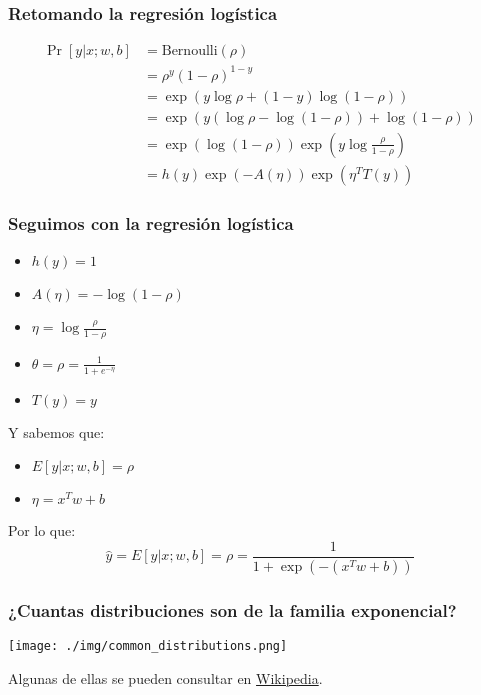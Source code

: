 \documentclass{beamer}
\begin{document}
\begin{frame}
  \frametitle{Retomando la regresión logística}

  \begin{align*}
    \Pr[y | x; w, b] &= \text{Bernoulli}(\rho) \\
    &= \rho^{y} (1 - \rho)^{1 - y} \\
    &= \exp(y \log \rho + (1 - y) \log (1 - \rho)) \\
    &= \exp(y (\log \rho - \log (1 - \rho)) + \log (1 - \rho)) \\
    &= \exp(\log (1 - \rho)) \exp(y \log \frac{\rho}{1 - \rho}) \\
    &= h(y) \exp(-A(\eta)) \exp(\eta^T T(y))
  \end{align*}

\end{frame}

\begin{frame}
  \frametitle{Seguimos con la regresión logística}

  \begin{itemize}
    \item $h(y) = 1$
    \item $A(\eta) = -\log (1 - \rho)$
    \item $\eta = \log \frac{\rho}{1 - \rho}$
    \item $\theta = \rho = \frac{1}{1 + e^{-\eta}}$
    \item $T(y) = y$
  \end{itemize}

  Y sabemos que:
  \begin{itemize}
    \item $E[y | x; w, b] = \rho$
    \item $\eta = x^T w + b$
  \end{itemize}

  Por lo que:
  $$
  \hat{y} = E[y | x; w, b] = \rho = \frac{1}{1 + \exp(-(x^T w + b))}
  $$
\end{frame}

\begin{frame}
  \frametitle{¿Cuantas distribuciones son de la familia exponencial?}

  \begin{center}
    \texttt{[image: ./img/common\_distributions.png]}
  
    Algunas de ellas se pueden consultar en \href{https://en.wikipedia.org/wiki/Exponential_family\#Table_of_distributions}{Wikipedia}.
      
  \end{center}
\end{frame}
\end{document}
